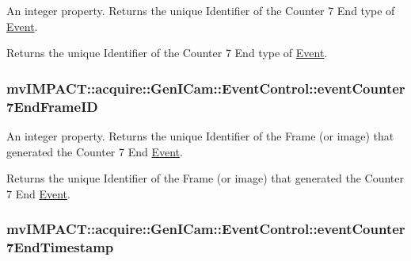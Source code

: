 An integer property. Returns the unique Identifier of the Counter 7 End type of \hyperlink{classmv_i_m_p_a_c_t_1_1acquire_1_1_event}{Event}. 

Returns the unique Identifier of the Counter 7 End type of \hyperlink{classmv_i_m_p_a_c_t_1_1acquire_1_1_event}{Event}. \hypertarget{classmv_i_m_p_a_c_t_1_1acquire_1_1_gen_i_cam_1_1_event_control_a7fd73295c65abfd53af8dd89a0ee4e47}{
\subsubsection[{event\+Counter7\+End\+Frame\+I\+D}]{ mv\+I\+M\+P\+A\+C\+T\+::acquire\+::\+Gen\+I\+Cam\+::\+Event\+Control\+::event\+Counter7\+End\+Frame\+I\+D}}\label{classmv_i_m_p_a_c_t_1_1acquire_1_1_gen_i_cam_1_1_event_control_a7fd73295c65abfd53af8dd89a0ee4e47}


An integer property. Returns the unique Identifier of the Frame (or image) that generated the Counter 7 End \hyperlink{classmv_i_m_p_a_c_t_1_1acquire_1_1_event}{Event}. 

Returns the unique Identifier of the Frame (or image) that generated the Counter 7 End \hyperlink{classmv_i_m_p_a_c_t_1_1acquire_1_1_event}{Event}. \hypertarget{classmv_i_m_p_a_c_t_1_1acquire_1_1_gen_i_cam_1_1_event_control_a0d2893a55857e0a60086a5a4fa5dcd46}{
\subsubsection[{event\+Counter7\+End\+Timestamp}]{ mv\+I\+M\+P\+A\+C\+T\+::acquire\+::\+Gen\+I\+Cam\+::\+Event\+Control\+::event\+Counter7\+End\+Timestamp}}\label{classmv_i_m_p_a_c_t_1_1acquire_1_1_gen_i_cam_1_1_event_control_a0d2893a55857e0a60086a5a4fa5dcd46}


